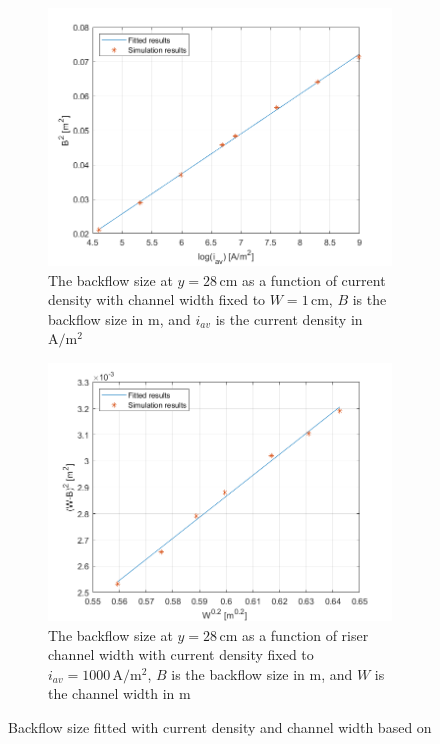 \begin{figure}[H]
\centering
\begin{subfigure}{.45\textwidth}
  \centering
  \includegraphics[width=1\linewidth]{backflowfittedwithcurrentdensity.png}
  \caption{The backflow size at $y = 28 \, \mathrm{cm}$ as a function of current density with channel width fixed to $W = 1\, \mathrm{cm}$, $B$ is the backflow size in $\mathrm{m}$, and $i_{av}$ is the current density in $\mathrm{A/m^2}$}
\end{subfigure}
\begin{subfigure}{.45\textwidth}
  \centering
  \includegraphics[width=1\linewidth]{backflowfittedwithgapwidth.png}
  \caption{The backflow size at $y = 28 \, \mathrm{cm}$ as a function of riser channel width with current density fixed to $ i_{av} = 1000\, \mathrm{A/m^2}$, $B$ is the backflow size in $\mathrm{m}$, and $W$ is the channel width in $\mathrm{m}$}
  \label{backflow2}
\end{subfigure}
\caption{Backflow size fitted with current density and channel width based on}
\label{Backflowfit}
\end{figure}





